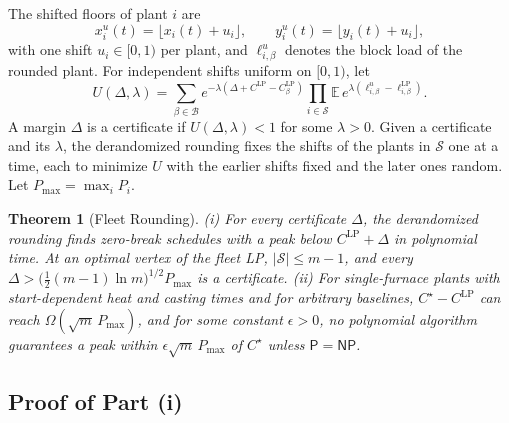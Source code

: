 \documentclass[11pt]{article}
\newtheorem{theorem}{Theorem}
\newcommand{\calB}{\mathcal{B}}
\newcommand{\calS}{\mathcal{S}}
\newcommand{\Cs}{C^{\star}}
\newcommand{\CLP}{C^{\mathrm{LP}}}
\begin{document}
The shifted floors of plant $i$ are
\begin{equation}\label{eq:shift}
x_i^u(t)=\lfloor x_i(t)+u_i\rfloor,\qquad y_i^u(t)=\lfloor y_i(t)+u_i\rfloor,
\end{equation}
with one shift $u_i\in[0,1)$ per plant, and $\ell^u_{i,\beta}$ denotes the block load of the rounded plant. For
independent shifts uniform on $[0,1)$, let
\begin{equation}\label{eq:U}
U(\Delta,\lambda)=\sum_{\beta\in\calB}e^{-\lambda(\Delta+\CLP-\CLP_\beta)}\prod_{i\in\calS}
\mathbb E\,e^{\lambda(\ell^u_{i,\beta}-\ell^{\mathrm{LP}}_{i,\beta})}.
\end{equation}
A margin $\Delta$ is a certificate if $U(\Delta,\lambda)<1$ for some $\lambda>0$. Given a certificate and its
$\lambda$, the derandomized rounding fixes the shifts of the plants in $\calS$ one at a time, each to minimize $U$ with
the earlier shifts fixed and the later ones random. Let $P_{\max}=\max_iP_i$.

\begin{theorem}[Fleet Rounding]
(i) For every certificate $\Delta$, the derandomized rounding finds zero-break schedules with a peak below
$\CLP+\Delta$ in polynomial time. At an optimal vertex of the fleet LP, $|\calS|\le m-1$, and every
$\Delta>\big(\tfrac12(m-1)\ln m\big)^{1/2}P_{\max}$ is a certificate. (ii) For single-furnace plants with
start-dependent heat and casting times and for arbitrary baselines, $\Cs-\CLP$ can reach $\Omega(\sqrt m\,P_{\max})$,
and for some constant $\epsilon>0$, no polynomial algorithm guarantees a peak within $\epsilon\sqrt m\,P_{\max}$ of $\Cs$
unless $\mathsf P=\mathsf{NP}$.
\end{theorem}

\subsection{Proof of Part (i)}
\end{document}
